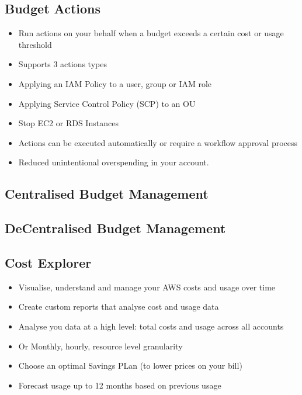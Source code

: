 \subsection{Budget Actions}
\begin{itemize}
    \item Run actions on your behalf when a budget exceeds a certain cost or usage threshold
    \item Supports 3 actions types
    \item Applying an IAM Policy to a user, group or IAM role
    \item Applying Service Control Policy (SCP) to an OU
    \item Stop EC2 or RDS Instances
    \item Actions can be executed automatically or require a workflow approval process
    \item Reduced unintentional overspending in your account.
\end{itemize}

\subsection{Centralised Budget Management}

\subsection{DeCentralised Budget Management}

\subsection{Cost Explorer}
\begin{itemize}
    \item Visualise, understand and manage your AWS costs and usage over time
    \item Create custom reports that analyse cost and usage data
    \item Analyse you data at a high level: total costs and usage across all accounts
    \item Or Monthly, hourly, resource level granularity
    \item Choose an optimal Savings PLan (to lower prices on your bill)
    \item Forecast usage up to 12 months based on previous usage
\end{itemize}




